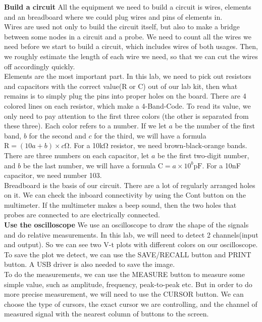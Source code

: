 \hfill \newline
\textbf{Build a circuit} \newline
\phantom{ } All the equipment we need to build a circuit is wires, elements and an breadboard where we could plug wires and pins of elements in.\\
\phantom{ } Wires are used not only to build the circuit itself, but also to make a bridge between some nodes in a circuit and a probe. We need to count all the wires we need before we start to build a circuit, which includes wires of both usages. Then, we roughly estimate the length of each wire we need, so that we can cut the wires off accordingly quickly.\\
\phantom{ } Elements are the most important part. In this lab, we need to pick out resistors and capacitors with the correct value(R or C) out of our lab kit, then what remains is to simply plug the pins into proper holes on the board. There are 4 colored lines on each resistor, which make a 4-Band-Code. To read its value, we only need to pay attention to the first three colors (the other is separated from these three). Each color refers to a number. If we let $a$ be the number of the first band, $b$ for the second and $c$ for the third, we will have a formula $\mathrm{R} = (10a+b)\times c\mathrm{\Omega}$. For a 10k$\mathrm{\Omega}$ resistor, we need brown-black-orange bands. There are three numbers on each capacitor, let $a$ be the first two-digit number, and $b$ be the last number, we will have a formula $\mathrm{C} = a \times 10^b \mathrm{pF}$. For a 10nF capacitor, we need number 103.\\
\phantom{ } Breadboard is the basis of our circuit. There are a lot of regularly arranged holes on it. We can check the inboard connectivity by using the Cont button on the multimeter. If the multimeter makes a beep sound, then the two holes that probes are connected to are electrically connected.\\
\textbf{Use the oscilloscope} \newline
\phantom{ } We use an oscilloscope to draw the shape of the signals and do relative measurements. In this lab, we will need to detect 2 channels(input and output). So we can see two V-t plots with different colors on our oscilloscope. To save the plot we detect, we can use the SAVE/RECALL button and PRINT button. A USB driver is also needed to save the image.\\
\phantom{ } To do the measurements, we can use the MEASURE button to measure some simple value, such as amplitude, frequency, peak-to-peak etc. But in order to do more precise measurement, we will need to use the CURSOR button. We can choose the type of cursors, the exact cursor we are controlling, and the channel of measured signal with the nearest column of buttons to the screen.\\

